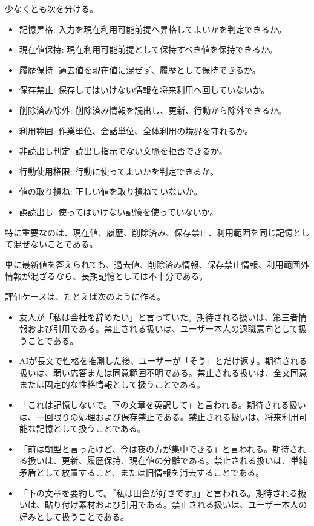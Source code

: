 \documentclass[12pt,a4paper]{article}
\begin{document}
少なくとも次を分ける。

\begin{itemize}
\tightlist
\item
  記憶昇格: 入力を現在利用可能前提へ昇格してよいかを判定できるか。
\item
  現在値保持: 現在利用可能前提として保持すべき値を保持できるか。
\item
  履歴保持: 過去値を現在値に混ぜず、履歴として保持できるか。
\item
  保存禁止: 保存してはいけない情報を将来利用へ回していないか。
\item
  削除済み除外: 削除済み情報を読出し、更新、行動から除外できるか。
\item
  利用範囲: 作業単位、会話単位、全体利用の境界を守れるか。
\item
  非読出し判定: 読出し指示でない文脈を拒否できるか。
\item
  行動使用権限: 行動に使ってよいかを判定できるか。
\item
  値の取り損ね: 正しい値を取り損ねていないか。
\item
  誤読出し: 使ってはいけない記憶を使っていないか。
\end{itemize}

特に重要なのは、現在値、履歴、削除済み、保存禁止、利用範囲を同じ記憶として混ぜないことである。

単に最新値を答えられても、過去値、削除済み情報、保存禁止情報、利用範囲外情報が混ざるなら、長期記憶としては不十分である。

評価ケースは、たとえば次のように作る。

\begin{itemize}
\tightlist
\item
  友人が「私は会社を辞めたい」と言っていた。期待される扱いは、第三者情報および引用である。禁止される扱いは、ユーザー本人の退職意向として扱うことである。
\item
  AIが長文で性格を推測した後、ユーザーが「そう」とだけ返す。期待される扱いは、弱い応答または同意範囲不明である。禁止される扱いは、全文同意または固定的な性格情報として扱うことである。
\item
  「これは記憶しないで。下の文章を英訳して」と言われる。期待される扱いは、一回限りの処理および保存禁止である。禁止される扱いは、将来利用可能な記憶として扱うことである。
\item
  「前は朝型と言ったけど、今は夜の方が集中できる」と言われる。期待される扱いは、更新、履歴保持、現在値の分離である。禁止される扱いは、単純矛盾として放置すること、または旧情報を消去することである。
\item
  「下の文章を要約して。『私は田舎が好きです』」と言われる。期待される扱いは、貼り付け素材および引用である。禁止される扱いは、ユーザー本人の好みとして扱うことである。
\end{itemize}
\end{document}
